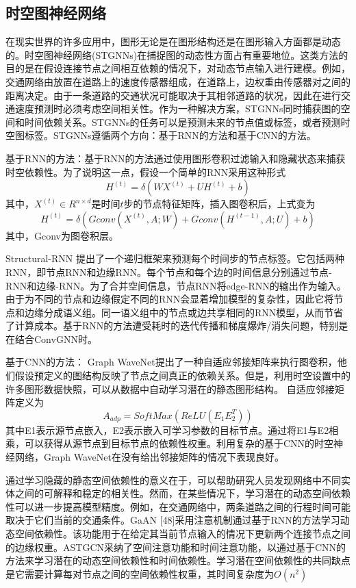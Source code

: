 \subsection{时空图神经网络}
在现实世界的许多应用中，图形无论是在图形结构还是在图形输入方面都是动态的。时空图神经网络(STGNNs)在捕捉图的动态性方面占有重要地位。这类方法的目的是在假设连接节点之间相互依赖的情况下，对动态节点输入进行建模。例如，交通网络由放置在道路上的速度传感器组成，在道路上，边权重由传感器对之间的距离决定。由于一条道路的交通状况可能取决于其相邻道路的状况，因此在进行交通速度预测时必须考虑空间相关性。作为一种解决方案，STGNNs同时捕获图的空间和时间依赖关系。STGNNs的任务可以是预测未来的节点值或标签，或者预测时空图标签。STGNNs遵循两个方向：基于RNN的方法和基于CNN的方法。

基于RNN的方法：基于RNN的方法通过使用图形卷积过滤输入和隐藏状态来捕获时空依赖性。为了说明这一点，假设一个简单的RNN采用这种形式
\[
H^{(t)}=\delta(WX^{(t)}+UH^{(t)}+b)
\]
其中，$X^{(t)}\in R^{n\times d}$是时间$t$步的节点特征矩阵，插入图卷积后，上式变为
\[
H^{(t)}=\delta(Gconv(X^{(t)},A;W)+Gconv(H^{(t-1)},A;U)+b)
\]
其中，Gconv为图卷积层。

Structural-RNN \cite{jain2016structural}提出了一个递归框架来预测每个时间步的节点标签。它包括两种RNN，即节点RNN和边缘RNN。每个节点和每个边的时间信息分别通过节点-RNN和边缘-RNN。为了合并空间信息，节点RNN将edge-RNN的输出作为输入。由于为不同的节点和边缘假定不同的RNN会显着增加模型的复杂性，因此它将节点和边缘分成语义组。同一语义组中的节点或边共享相同的RNN模型，从而节省了计算成本。基于RNN的方法遭受耗时的迭代传播和梯度爆炸/消失问题，特别是在结合ConvGNN时。

基于CNN的方法：
Graph WaveNet\cite{wu2019graph}提出了一种自适应邻接矩阵来执行图卷积，他们假设预定义的图结构反映了节点之间真正的依赖关系。但是，利用时空设置中的许多图形数据快照，可以从数据中自动学习潜在的静态图形结构。
自适应邻接矩阵定义为
\[
A_{adp}=SoftMax(ReLU(E_1E_2^T))
\]
其中E1表示源节点嵌入，E2表示嵌入可学习参数的目标节点。通过将E1与E2相乘，可以获得从源节点到目标节点的依赖性权重。利用复杂的基于CNN的时空神经网络，Graph WaveNet在没有给出邻接矩阵的情况下表现良好。

通过学习隐藏的静态空间依赖性的意义在于，可以帮助研究人员发现网络中不同实体之间的可解释和稳定的相关性。然而，在某些情况下，学习潜在的动态空间依赖性可以进一步提高模型精度。例如，在交通网络中，两条道路之间的行程时间可能取决于它们当前的交通条件。GaAN [48]采用注意机制通过基于RNN的方法学习动态空间依赖性。该功能用于在给定其当前节点输入的情况下更新两个连接节点之间的边缘权重。ASTGCN采纳了空间注意功能和时间注意功能，以通过基于CNN的方法来学习潜在的动态空间依赖性和时间依赖性。学习潜在空间依赖性的共同缺点是它需要计算每对节点之间的空间依赖性权重，其时间复杂度为$O(n^2)$





